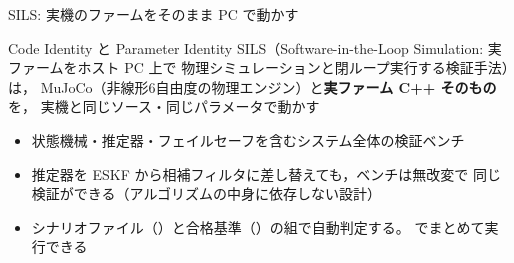 \begin{frame}{SILS: 実機のファームをそのまま PC で動かす}
  \begin{block}{Code Identity と Parameter Identity}\small
    SILS（Software-in-the-Loop Simulation: 実ファームをホスト PC 上で
    物理シミュレーションと閉ループ実行する検証手法）は，
    MuJoCo（非線形6自由度の物理エンジン）と\textbf{実ファーム C++ そのもの}を，
    実機と同じソース・同じパラメータで動かす
  \end{block}

  \vspace{0.5em}

  \begin{itemize}\small
    \item 状態機械・推定器・フェイルセーフを含むシステム全体の検証ベンチ
    \item 推定器を ESKF から相補フィルタに差し替えても，ベンチは無改変で
          同じ検証ができる（アルゴリズムの中身に依存しない設計）
    \item シナリオファイル（）と合格基準（）の組で自動判定する。
           でまとめて実行できる
  \end{itemize}
\end{frame}


